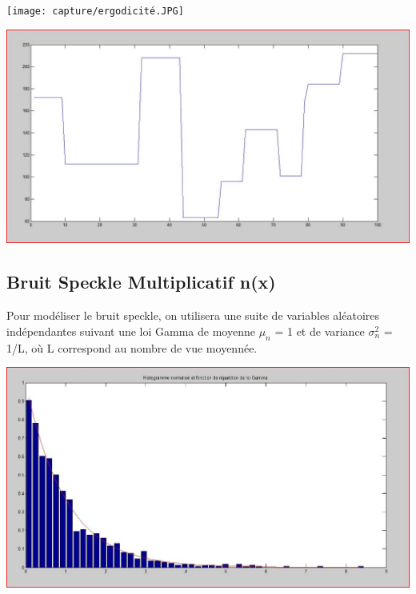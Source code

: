 \documentclass[a4paper,11pt]{article}
\newcommand{\FSource}[1]{%
  
  }
\begin{document}
\vspace{0.5cm}

\FSource{matlab/1.m}

\vspace{0.5cm}

\texttt{[image: capture/ergodicité.JPG]}

\includegraphics[width=15cm]{capture/Capturer.JPG}

\subsection{Bruit Speckle Multiplicatif n(x)}

Pour modéliser le bruit speckle, on utilisera une suite de variables aléatoires indépendantes suivant une loi Gamma de moyenne $\mu_n$ = 1 et de variance $\sigma_n^2$ = 1/L, où L correspond au nombre de vue moyennée.

\vspace{0.5cm}

\FSource{matlab/2.m}

\vspace{0.5cm}

\includegraphics[width=15cm]{capture/bruit.JPG}
\end{document}
